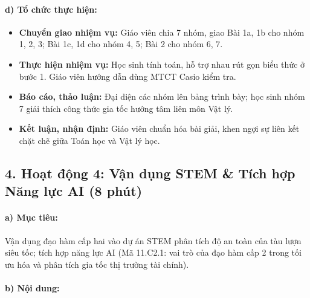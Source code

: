 \documentclass[12pt, a4paper]{article}
\begin{document}
\paragraph{d) Tổ chức thực hiện:}
\begin{itemize}[leftmargin=0.8cm]
    \item \textbf{Chuyển giao nhiệm vụ:} Giáo viên chia 7 nhóm, giao Bài 1a, 1b cho nhóm 1, 2, 3; Bài 1c, 1d cho nhóm 4, 5; Bài 2 cho nhóm 6, 7.
    \item \textbf{Thực hiện nhiệm vụ:} Học sinh tính toán, hỗ trợ nhau rút gọn biểu thức ở bước 1. Giáo viên hướng dẫn dùng MTCT Casio kiểm tra.
    \item \textbf{Báo cáo, thảo luận:} Đại diện các nhóm lên bảng trình bày; học sinh nhóm 7 giải thích công thức gia tốc hướng tâm liên môn Vật lý.
    \item \textbf{Kết luận, nhận định:} Giáo viên chuẩn hóa bài giải, khen ngợi sự liên kết chặt chẽ giữa Toán học và Vật lý học.
\end{itemize}

\subsection*{4. Hoạt động 4: Vận dụng STEM & Tích hợp Năng lực AI (8 phút)}

\paragraph{a) Mục tiêu:} Vận dụng đạo hàm cấp hai vào dự án STEM phân tích độ an toàn của tàu lượn siêu tốc; tích hợp năng lực AI (Mã 11.C2.1: vai trò của đạo hàm cấp 2 trong tối ưu hóa và phân tích gia tốc thị trường tài chính).

\paragraph{b) Nội dung:}
\end{document}
